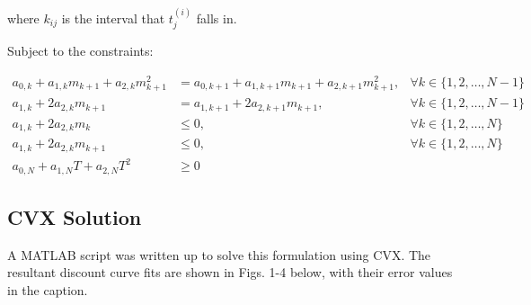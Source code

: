 \documentclass[a4paper]{article}
\begin{document}
where $k_{ij}$ is the interval that $t_j^{(i)}$ falls in.

Subject to the constraints:

\begin{equation}
  \begin{aligned}
    a_{0,k} + a_{1,k} m_{k+1} + a_{2,k} m_{k+1}^2
    &=
    a_{0,k+1} + a_{1,k+1} m_{k+1} + a_{2,k+1} m_{k+1}^2
    , &\forall k \in \{1,2,\dots,N-1\}
    \\
    a_{1,k} + 2 a_{2,k} m_{k+1}
    &=
    a_{1,k+1} + 2 a_{2,k+1} m_{k+1}
    , &\forall k \in \{1,2,\dots,N-1\}
    \\
    a_{1,k} + 2 a_{2,k} m_k     &\leq 0 , & \forall k \in \{1,2,\dots,N\}
    \\
    a_{1,k} + 2 a_{2,k} m_{k+1} &\leq 0 , & \forall k \in \{1,2,\dots,N\}
    \\
    a_{0,N} + a_{1,N} T + a_{2,N} T^2 &\geq 0 &
  \end{aligned}
\end{equation}

\subsection{CVX Solution}
A MATLAB script was written up to solve this formulation using CVX.
The resultant discount curve fits are shown in Figs. 1-4 below, with their error values in the caption.
\end{document}
